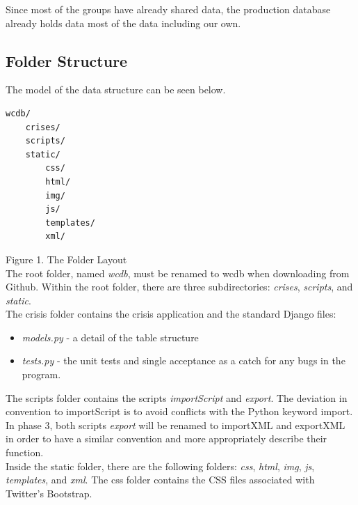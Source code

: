 \documentclass[12pt]{report}
\begin{document}
Since most of the groups have already shared data, the production database already holds data most of the data including our own.\\

\subsection*{Folder Structure}
\hfill


The model of the data structure can be seen below.\\

\begin{lstlisting}
wcdb/
    crises/
    scripts/
    static/
        css/
        html/
        img/
        js/
        templates/
        xml/
\end{lstlisting}
\footnotesize Figure 1. The Folder Layout \normalsize
\hfill\\


The root folder, named \emph{wcdb}, must be renamed to wcdb when downloading from Github.
Within the root folder, there are three subdirectories: \emph{crises}, \emph{scripts}, and \emph{static}.\\


The crisis folder contains the crisis application and the standard Django files: 
\begin{itemize}
\item \emph{models.py} - a detail of the table structure 
\item \emph{tests.py} - the unit tests and single acceptance as a catch for any bugs in the program.
\end{itemize}


The scripts folder contains the scripts \emph{importScript} and \emph{export}.
The deviation in convention to importScript is to avoid conflicts with the Python keyword import.
In phase 3, both scripts \emph{export} will be renamed to importXML and exportXML in order to have a similar 
convention and more appropriately describe their function.\\


Inside the static folder, there are the following folders: \emph{css}, \emph{html}, \emph{img}, \emph{js}, \emph{templates}, and \emph{xml}.
The css folder contains the CSS files associated with Twitter's Bootstrap.\\
\end{document}
